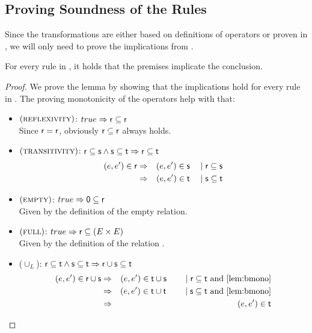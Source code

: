 \documentclass[a4paper,twoside,12pt, english]{article}
\begin{document}
\pagebreak
\subsection{Proving Soundness of the Rules}\label{sec:prvrelimp}
Since the transformations are either based on definitions of operators or proven in , we will only need to prove the implications from .

\begin{lemma}\label{lem:implications}
For every rule in , it holds that the premises implicate the conclusion.
\end{lemma}
\begin{proof}
We prove the lemma by showing that the implications hold for every rule in . The  proving monotonicity of the operators help with that:


\begin{itemize}
\item $(\textsc{reflexivity})$: $true \Rightarrow \sf r \subseteq r$ \\ 
Since $\sf r=r$, obviously $\sf r \subseteq r$ always holds.
\item $(\textsc{transitivity})$: $\sf r \subseteq s \land s \subseteq t \Rightarrow r \subseteq t$
\begin{eqnarray*}
(e,e') \in \sf r &\Rightarrow & (e,e') \in \sf s \quad \mid \sf r \subseteq s \\
&\Rightarrow & (e,e') \in \sf t \quad \mid \sf s \subseteq t
\end{eqnarray*}

\item $(\textsc{empty})$: $true \Rightarrow \textsf{\upshape 0} \subseteq \textsf{\upshape r}$ \\
Given by the definition of the empty relation.

\item $(\textsc{full})$: $true \Rightarrow \textsf{\upshape r} \subseteq (E \times E)$ \\
Given by the definition of the relation \relr.


\item ($\cup_{L}$): $\textsf{\upshape r} \subseteq \textsf{\upshape t} \land \textsf{\upshape s} \subseteq \textsf{\upshape t} \Rightarrow \textsf{\upshape r} \cup \textsf{\upshape s} \subseteq \textsf{\upshape t}$
\begin{eqnarray*}
\edgein \relr \cup \Rels &\impl & \edgein \relt \cup \rels \reason{\relr \subseteq \relt \text{ and } \Cref{lem:bmono}}\\
&\impl & \edgein \relt \cup \relt \reason{\rels \subseteq \relt \text{ and } \Cref{lem:bmono}} \\
&\impl & \edgein \relt
\end{eqnarray*}



\end{itemize}
\end{proof}
\end{document}
